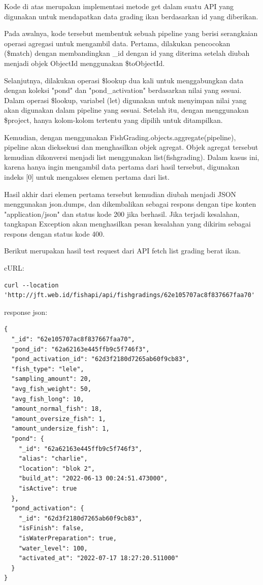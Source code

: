 \begin{enumerate}[1.]
Kode di atas merupakan implementasi metode get dalam suatu API yang digunakan untuk mendapatkan data grading ikan berdasarkan id yang diberikan.

Pada awalnya, kode tersebut membentuk sebuah pipeline yang berisi serangkaian operasi agregasi untuk mengambil data. Pertama, dilakukan pencocokan (\$match) dengan membandingkan \_id dengan id yang diterima setelah diubah menjadi objek ObjectId menggunakan \$toObjectId.

Selanjutnya, dilakukan operasi \$lookup dua kali untuk menggabungkan data dengan koleksi "pond" dan "pond\_activation" berdasarkan nilai yang sesuai. Dalam operasi \$lookup, variabel (let) digunakan untuk menyimpan nilai yang akan digunakan dalam pipeline yang sesuai. Setelah itu, dengan menggunakan \$project, hanya kolom-kolom tertentu yang dipilih untuk ditampilkan.

Kemudian, dengan menggunakan FishGrading.objects.aggregate(pipeline), pipeline akan dieksekusi dan menghasilkan objek agregat. Objek agregat tersebut kemudian dikonversi menjadi list menggunakan list(fishgrading). Dalam kasus ini, karena hanya ingin mengambil data pertama dari hasil tersebut, digunakan indeks [0] untuk mengakses elemen pertama dari list.

Hasil akhir dari elemen pertama tersebut kemudian diubah menjadi JSON menggunakan json.dumps, dan dikembalikan sebagai respons dengan tipe konten "application/json" dan status kode 200 jika berhasil. Jika terjadi kesalahan, tangkapan Exception akan menghasilkan pesan kesalahan yang dikirim sebagai respons dengan status kode 400.

Berikut merupakan hasil test request dari API fetch list grading berat ikan.

cURL:

\begin{lstlisting}
curl --location 'http://jft.web.id/fishapi/api/fishgradings/62e105707ac8f837667faa70'
\end{lstlisting}

response json:

\begin{lstlisting}
{
  "_id": "62e105707ac8f837667faa70",
  "pond_id": "62a62163e445ffb9c5f746f3",
  "pond_activation_id": "62d3f2180d7265ab60f9cb83",
  "fish_type": "lele",
  "sampling_amount": 20,
  "avg_fish_weight": 50,
  "avg_fish_long": 10,
  "amount_normal_fish": 18,
  "amount_oversize_fish": 1,
  "amount_undersize_fish": 1,
  "pond": {
    "_id": "62a62163e445ffb9c5f746f3",
    "alias": "charlie",
    "location": "blok 2",
    "build_at": "2022-06-13 00:24:51.473000",
    "isActive": true
  },
  "pond_activation": {
    "_id": "62d3f2180d7265ab60f9cb83",
    "isFinish": false,
    "isWaterPreparation": true,
    "water_level": 100,
    "activated_at": "2022-07-17 18:27:20.511000"
  }
}
\end{lstlisting}



\end{enumerate}